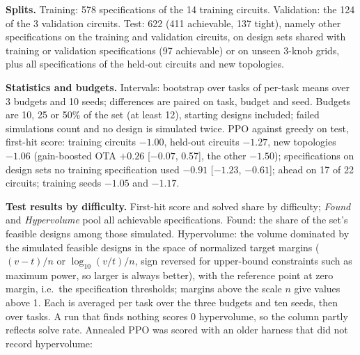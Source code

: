 \documentclass[10pt]{article}
\begin{document}
\textbf{Splits.} Training: 578 specifications of the 14 training circuits. Validation: the 124 of the 3 validation
circuits. Test: 622 (411 achievable, 137 tight), namely other specifications on the training and validation circuits,
on design sets shared with training or validation specifications (97 achievable) or on unseen 3-knob grids, plus all
specifications of the held-out circuits and new topologies.

\textbf{Statistics and budgets.} Intervals: bootstrap over tasks of per-task means over 3 budgets and 10 seeds;
differences are paired on task, budget and seed. Budgets are 10, 25 or 50\% of the set (at least 12), starting designs
included; failed simulations count and no design is simulated twice. PPO against greedy on test, first-hit score:
training circuits $-1.00$, held-out circuits $-1.27$, new topologies $-1.06$ (gain-boosted OTA $+0.26$ [$-0.07$,
0.57], the other $-1.50$); specifications on design sets no training specification used $-0.91$ [$-1.23$, $-0.61$];
ahead on 17 of 22 circuits; training seeds $-1.05$ and $-1.17$.

\textbf{Test results by difficulty.} First-hit score and solved share by difficulty; \emph{Found} and
\emph{Hypervolume} pool all achievable specifications. Found: the share of the set's feasible designs among those
simulated. Hypervolume: the volume dominated by the simulated feasible designs in the space of normalized target
margins ($(v-t)/n$ or $\log_{10}(v/t)/n$, sign reversed for upper-bound constraints such as maximum power, so larger
is always better), with the reference point at zero margin, i.e.\ the
specification thresholds; margins above the scale $n$ give values above 1. Each is averaged per task over the three
budgets and ten seeds, then over tasks. A run that finds nothing scores 0 hypervolume, so the column partly reflects
solve rate. Annealed PPO was scored with an older harness that did not record hypervolume:
\end{document}

